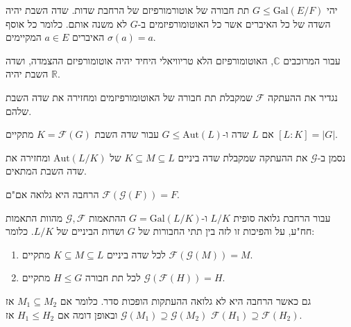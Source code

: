 \documentclass{tstextbook}
\begin{document}
\begin{definition}
יהי \(G\leq \mathrm{Gal}(E / F)\) תת חבורה של אוטורמורפיזם של הרחבת שדות. שדה השבת יהיה השדה של כל האיברים אשר כל האוטומורפיזמים ב-\(G\) לא משנה אותם. כלומר כל אוסף האיברים \(a \in E\) המקיימים \(\sigma(a)=a\).

\end{definition}
\begin{example}
עבור המרוכבים \(\mathbb{C}\), האוטומורפיזם הלא טריוויאלי היחיד יהיה אוטומורפיזם ההצמדה, ושדה השבת יהיה \(\mathbb{R}\).

\end{example}
\begin{definition}
נגדיר את ההעתקה \(\mathcal{F}\) שמקבלת תת חבורה של האוטומורפיזמים ומחזירה את שדה השבת שלהם.

\end{definition}
\begin{proposition}
אם \(L\) שדה ו-\(G\leq \mathrm{Aut}(L)\) עבור שדה השבת \(K=\mathcal{F}(G)\) מתקיים \([L:K]=\lvert G \rvert\).

\end{proposition}
\begin{definition}
נסמן ב-\(\mathcal{G}\) את ההעתקה שמקבלת שדה ביניים \(K\subseteq M\subseteq L\) של \(\mathrm{Aut}(L / K)\) ומחזירה את שדה השבת המתאים.

\end{definition}
\begin{corollary}
הרחבה היא גלואה אם"ם \(\mathcal{F}\left( \mathcal{G}(F) \right)=F\).

\end{corollary}
\begin{theorem}
עבור הרחבת גלואה סופית \(L / K\) ו-\(G=\mathrm{Gal}(L / K)\) ההתאמות \(\mathcal{G,F}\) מהוות התאמות חח"ע, על והפיכות זו לזה בין תתי החבורות של \(G\) ושדות הביניים של \(L / K\). כלומר:

  \begin{enumerate}
    \item לכל שדה ביניים \(K\subseteq M\subseteq L\) מתקיים \(\mathcal{F}\left( \mathcal{G}(M) \right)=M\). 


    \item לכל תת חבורה \(H\leq G\) מתקיים \(\mathcal{G}\left( \mathcal{F}(H) \right)=H\). 


  \end{enumerate}
\end{theorem}
\begin{proposition}
גם כאשר הרחבה היא לא גלואה ההעתקות הופכות סדר. כלומר אם \(M_{1}\subseteq M_{2}\) אז \(\mathcal{G}(M_{1})\supseteq \mathcal{G}(M_{2})\) ובאופן דומה אם \(H_{1}\leq H_{2}\) אז \(\mathcal{F}(H_{1})\supseteq \mathcal{F}(H_{2})\).

\end{proposition}
\end{document}
